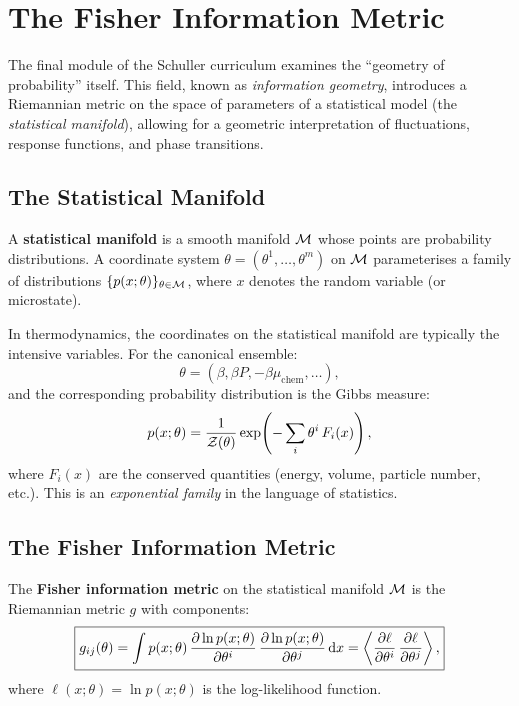 \chapter{The Fisher Information Metric}

The final module of the Schuller curriculum examines the ``geometry of probability'' itself. This field, known as \emph{information geometry}, introduces a Riemannian metric on the space of parameters of a statistical model (the \emph{statistical manifold}), allowing for a geometric interpretation of fluctuations, response functions, and phase transitions.

\section{The Statistical Manifold}

\begin{definition}
A \textbf{statistical manifold} is a smooth manifold $\mathcal{M}$ whose points are probability distributions. A coordinate system $\theta = (\theta^1, \ldots, \theta^m)$ on $\mathcal{M}$ parameterises a family of distributions $\{p(x; \theta)\}_{\theta \in \mathcal{M}}$, where $x$ denotes the random variable (or microstate).
\end{definition}

In thermodynamics, the coordinates on the statistical manifold are typically the intensive variables. For the canonical ensemble:
\begin{equation}
\theta = (\beta, \beta P, -\beta\mu_{\text{chem}}, \ldots),
\end{equation}
and the corresponding probability distribution is the Gibbs measure:
\begin{equation}
p(x; \theta) = \frac{1}{\mathcal{Z}(\theta)}\exp\!\left(-\sum_i \theta^i\,F_i(x)\right),
\end{equation}
where $F_i(x)$ are the conserved quantities (energy, volume, particle number, etc.). This is an \emph{exponential family} in the language of statistics.

\section{The Fisher Information Metric}

\begin{definition}
The \textbf{Fisher information metric} on the statistical manifold $\mathcal{M}$ is the Riemannian metric $g$ with components:
\begin{equation}
\boxed{g_{ij}(\theta) = \int p(x; \theta)\,\pdv{\ln p(x;\theta)}{\theta^i}\,\pdv{\ln p(x;\theta)}{\theta^j}\,\dd x = \left\langle \pdv{\ell}{\theta^i}\,\pdv{\ell}{\theta^j} \right\rangle,}
\end{equation}
where $\ell(x; \theta) = \ln p(x; \theta)$ is the log-likelihood function.
\end{definition}

